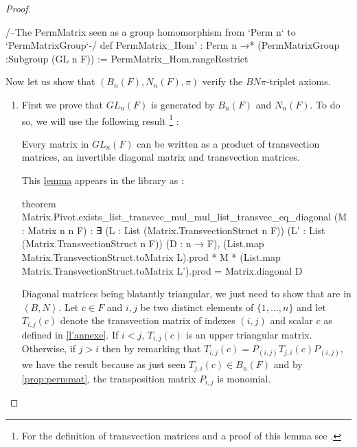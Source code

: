 \begin{proof}
\begin{leancode}
/--The PermMatrix seen as a group homomorphism from `Perm n` to `PermMatrixGroup`-/
def PermMatrix_Hom' : Perm n →* (PermMatrixGroup :Subgroup (GL n F)) :=
  PermMatrix_Hom.rangeRestrict

\end{leancode}

Now let us show that $\left( B_n(F),N_n(F), \pi \right)$ verify the $BN\pi$-triplet axioms.

\begin{enumerate}
    \item \label{GL1} First we prove that $GL_n\left( F \right)$ is generated by $B_{n}\left( F \right)$ and $N_n\left( F \right)$. To do so, we will use the following result \footnote{For the definition of transvection matrices and a proof of this lemma see \cite{oui oui la re}.} : 

\begin{lemme} \label{lem:trans}
    Every matrix in $GL_n\left( F \right)$ can be written as a product of transvection matrices, an invertible diagonal matrix and transvection matrices.
\end{lemme}
This \href{https://leanprover-community.github.io/mathlib4_docs/Mathlib/LinearAlgebra/Matrix/Transvection.html#Matrix.Pivot.exists_list_transvec_mul_mul_list_transvec_eq_diagonal}{lemma} appears in the \Mathlib library as :
\begin{leancode}
theorem Matrix.Pivot.exists_list_transvec_mul_mul_list_transvec_eq_diagonal 
  (M : Matrix n n F) : ∃ (L : List (Matrix.TransvectionStruct n F)) 
    (L' : List (Matrix.TransvectionStruct n F)) (D : n → F), 
      (List.map Matrix.TransvectionStruct.toMatrix L).prod * M * 
         (List.map Matrix.TransvectionStruct.toMatrix L').prod = Matrix.diagonal D
\end{leancode}

Diagonal matrices being blatantly triangular, we just need to show that  are in $\left<B,N \right>$. Let $c \in F$ and $i,j$ be two distinct elements of $\{ 1,\ldots,n\}$ and let $T_{i,j}\left( c \right)$ denote the transvection matrix of indexes $\left( i,j \right)$ and scalar $c$ as defined in \ref{l'annexe}. If $i<j$, $T_{i,j}\left( c \right)$ is an upper triangular matrix. Otherwise, if $j>i$ then by remarking that $T_{i,j}(c) = P_{\left( i,j \right)} T_{j,i}\left( c \right) P_{\left( i,j \right)}$, we have the result because as just seen $T_{j,i}\left( c \right) \in B_n\left( F \right)$ and by \ref{prop:permmat}, the transposition matrix $P_{i,j}$ is monomial.


\end{enumerate}
\end{proof}
